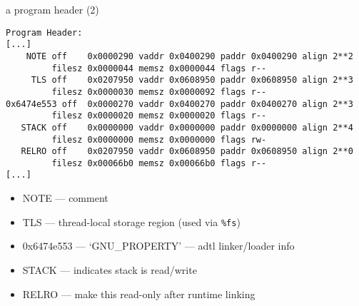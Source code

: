 \begin{frame}[fragile,label=elfExOver3]{a program header (2)}
\begin{Verbatim}[commandchars=\\\{\},fontsize=\fontsize{9}{10}\selectfont]
Program Header:
[...]
    NOTE off    0x0000290 vaddr 0x0400290 paddr 0x0400290 align 2**2
         filesz 0x0000044 memsz 0x0000044 flags r--
     TLS off    0x0207950 vaddr 0x0608950 paddr 0x0608950 align 2**3
         filesz 0x0000030 memsz 0x0000092 flags r--
0x6474e553 off  0x0000270 vaddr 0x0400270 paddr 0x0400270 align 2**3
         filesz 0x0000020 memsz 0x0000020 flags r--
   STACK off    0x0000000 vaddr 0x0000000 paddr 0x0000000 align 2**4
         filesz 0x0000000 memsz 0x0000000 flags rw-
   RELRO off    0x0207950 vaddr 0x0608950 paddr 0x0608950 align 2**0
         filesz 0x00066b0 memsz 0x00066b0 flags r--
[...]
\end{Verbatim}
\begin{itemize}
\item NOTE --- comment
\item TLS --- thread-local storage region (used via {\tt \%fs})
\item 0x6474e553 --- `GNU\_PROPERTY' --- adtl linker/loader info
\item STACK --- indicates stack is read/write
\item RELRO --- make this read-only after runtime linking
\end{itemize}
\end{frame}


